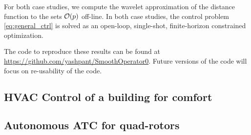 For both case studies, we compute the wavelet approximation of the distance function to the sets $\mathcal{O}(p)$ off-line. 
In both case studies, the control problem \eqref{eq:general_ctrl} is solved as an open-loop, single-shot, finite-horizon constrained optimization. 

The code to reproduce these results can be found at \protect\url{https://github.com/yashpant/SmoothOperator0}. Future versions of the code will focus on re-usability of the code. %


\vspace{-5pt}
\subsection{HVAC Control of a building for comfort}

\vspace{-11pt}
\subsection{Autonomous ATC for quad-rotors}
\label{sec:ATCquad}

